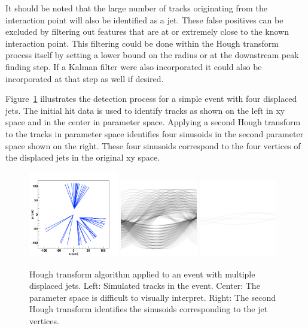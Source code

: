 \documentclass{JINST}
\begin{document}
It should be noted that the large number of tracks originating from the interaction point will also be identified as a jet.  These false positives can be excluded by filtering out features that are at or extremely close to the known interaction point.  This filtering could be done within the Hough transform process itself by setting a lower bound on the radius or at the downstream peak finding step.  If a Kalman filter were also incorporated it could also be incorporated at that step as well if desired.

Figure~\ref{fig:DisplacedJets} illustrates the detection process for a simple event with four displaced jets.  The initial hit data is used to identify tracks as shown on the left in xy space and in the center in parameter space.  Applying a second Hough transform to the tracks in parameter space identifies four sinusoids in the second parameter space shown on the right.  These four sinusoids correspond to the four vertices of the displaced jets in the original xy space.

\begin{figure}[!Hhtb]
\begin{center}
	\includegraphics[width=0.35\textwidth]{figs/jet2/tracks.pdf}
	\includegraphics[width=0.30\textwidth]{figs/jet2/accumulator.pdf}
	\includegraphics[width=0.30\textwidth]{figs/jet2/vertex.pdf}
	\caption{Hough transform algorithm applied to an event with multiple displaced jets. Left: Simulated
	tracks in the event. Center: The parameter space is difficult to visually interpret. Right: The
	second Hough transform identifies the sinusoids corresponding to the jet vertices.
	\label{fig:DisplacedJets}}
\end{center}
\end{figure}
\end{document}
